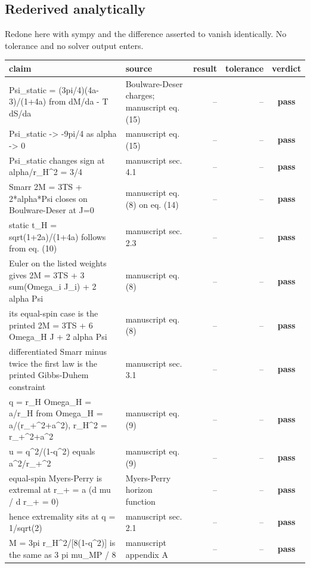 \documentclass[11pt,a4paper]{article}
\newcommand{\PASS}{\textcolor{pass}{\textbf{pass}}}
\begin{document}
\subsection*{Rederived analytically}
Redone here with sympy and the difference asserted to vanish identically. No tolerance and no solver output enters.

\begin{longtable}{@{}L{.38\textwidth}L{.24\textwidth}rrc@{}}
\toprule
claim & source & result & tolerance & verdict \\
\midrule\endhead
Psi\_static = (3pi/4)(4a-3)/(1+4a) from dM/da - T dS/da & Boulware-Deser charges; manuscript eq. (15) & -- & -- & \PASS \\
Psi\_static -> -9pi/4 as alpha -> 0 & manuscript eq. (15) & -- & -- & \PASS \\
Psi\_static changes sign at alpha/r\_H\textasciicircum{}2 = 3/4 & manuscript sec. 4.1 & -- & -- & \PASS \\
Smarr 2M = 3TS + 2*alpha*Psi closes on Boulware-Deser at J=0 & manuscript eq. (8) on eq. (14) & -- & -- & \PASS \\
static t\_H = sqrt(1+2a)/(1+4a) follows from eq. (10) & manuscript sec. 2.3 & -- & -- & \PASS \\
Euler on the listed weights gives 2M = 3TS + 3 sum(Omega\_i J\_i) + 2 alpha Psi & manuscript eq. (8) & -- & -- & \PASS \\
its equal-spin case is the printed 2M = 3TS + 6 Omega\_H J + 2 alpha Psi & manuscript eq. (8) & -- & -- & \PASS \\
differentiated Smarr minus twice the first law is the printed Gibbs-Duhem constraint & manuscript sec. 3.1 & -- & -- & \PASS \\
q = r\_H Omega\_H = a/r\_H from Omega\_H = a/(r\_+\textasciicircum{}2+a\textasciicircum{}2), r\_H\textasciicircum{}2 = r\_+\textasciicircum{}2+a\textasciicircum{}2 & manuscript eq. (9) & -- & -- & \PASS \\
u = q\textasciicircum{}2/(1-q\textasciicircum{}2) equals a\textasciicircum{}2/r\_+\textasciicircum{}2 & manuscript eq. (9) & -- & -- & \PASS \\
equal-spin Myers-Perry is extremal at r\_+ = a (d mu / d r\_+ = 0) & Myers-Perry horizon function & -- & -- & \PASS \\
hence extremality sits at q = 1/sqrt(2) & manuscript sec. 2.1 & -- & -- & \PASS \\
M = 3pi r\_H\textasciicircum{}2/[8(1-q\textasciicircum{}2)] is the same as 3 pi mu\_MP / 8 & manuscript appendix A & -- & -- & \PASS \\

\end{longtable}
\end{document}
